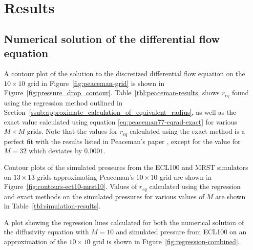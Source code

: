 
\section{Results} %
\label{sec:results}




\subsection{Numerical solution of the differential flow equation} %
\label{sub:numerical_solution_of_the_differential_flow_equation}
A contour plot of the solution to the discretized differential flow equation on the $10 \times 10$ grid in Figure~\ref{fig:peaceman-grid} is shown in Figure~\ref{fig:pressure_drop_contour}. Table~\ref{tbl:peaceman-results} shows $r_{eq}$ found using the regression method outlined in Section~\ref{ssub:approximate_calculation_of_equivalent_radius}, as well as the exact value calculated using equation \eqref{eq:peaceman77-eqrad-exact} for various $M\times M$ grids. Note that the values for $r_{eq}$ calculated using the exact method is a perfect fit with the results listed in Peaceman's paper \cite{Peaceman1978Interpretation}, except for the value for $M=32$ which deviates by $0.0001$.

Contour plots of the simulated pressures from the ECL100 and MRST simulators on $13\times 13$ grids approximating Peaceman's $10\times 10$ grid are shown in Figure~\ref{fig:contours-ect10-mrst10}. Values of $r_{eq}$ calculated using the regression and exact methods on the simulated pressures for various values of $M$ are shown in Table~\ref{tbl:simulation-results}.

A plot showing the regression lines calculated for both the numerical solution of the diffusivity equation with $M=10$ and simulated pressure from ECL100 on an approximation of the $10\times 10$ grid is shown in Figure~\ref{fig:regression-combined}.



